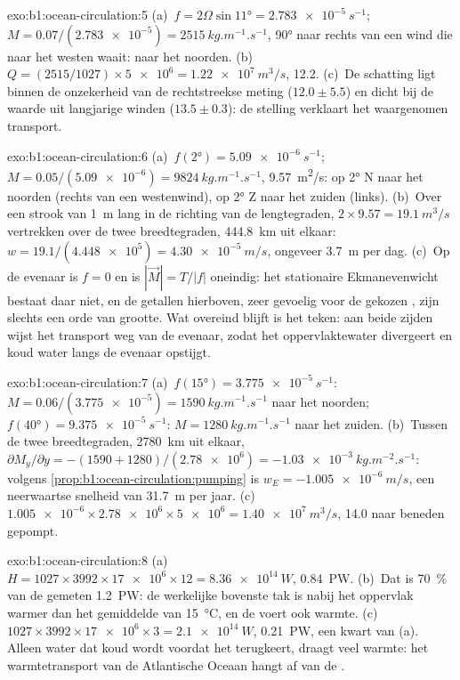 \begin{solution}{exo:b1:ocean-circulation:5}
(a)~$f = 2\Omega\sin\ang{11} = \qty{2.783e-5}{s^{-1}}$; $M = 0.07/(\num{2.783e-5}) =
\qty{2515}{kg.m^{-1}.s^{-1}}$, \ang{90} naar rechts van een wind die naar het westen waait:
naar het noorden. (b)~$Q = (2515/1027) \times \num{5e6} = \qty{1.22e7}{m^3/s}$,
\qty{12.2}{\sverdrup}. (c)~De schatting ligt binnen de onzekerheid van de rechtstreekse
meting ($12.0 \pm 5.5$) en dicht bij de waarde uit langjarige winden
($13.5 \pm 0.3$): de stelling verklaart het waargenomen transport.
\end{solution}

\begin{solution}{exo:b1:ocean-circulation:6}
(a)~$f(\ang{2}) = \qty{5.09e-6}{s^{-1}}$; $M = 0.05/(\num{5.09e-6}) =
\qty{9824}{kg.m^{-1}.s^{-1}}$, \qty{9.57}{m^2/s}: op \ang{2} N naar het noorden
(rechts van een westenwind), op \ang{2} Z naar het zuiden (links). (b)~Over een strook van
\qty{1}{m} lang in de richting van de lengtegraden, $2 \times 9.57 = \qty{19.1}{m^3/s}$ vertrekken over de twee
breedtegraden, \qty{444.8}{km} uit elkaar: $w = 19.1/(\num{4.448e5}) = \qty{4.30e-5}{m/s}$,
ongeveer \qty{3.7}{m} per dag. (c)~Op de evenaar is $f = 0$ en is $|\vec M| = T/|f|$
oneindig: het stationaire Ekmanevenwicht bestaat daar niet, en de getallen hierboven, zeer gevoelig voor de gekozen , zijn slechts een orde van grootte. Wat overeind blijft is het teken: aan beide zijden wijst het transport weg van de evenaar, zodat het oppervlaktewater divergeert en koud water langs de evenaar opstijgt.
\end{solution}

\begin{solution}{exo:b1:ocean-circulation:7}
(a)~$f(\ang{15}) = \qty{3.775e-5}{s^{-1}}$: $M = 0.06/(\num{3.775e-5}) =
\qty{1590}{kg.m^{-1}.s^{-1}}$ naar het noorden; $f(\ang{40}) =
\qty{9.375e-5}{s^{-1}}$: $M = \qty{1280}{kg.m^{-1}.s^{-1}}$ naar het zuiden.
(b)~Tussen de twee breedtegraden, \qty{2780}{km} uit elkaar, $\partial M_y/\partial y =
-(1590 + 1280)/(\num{2.78e6}) = \qty{-1.03e-3}{kg.m^{-2}.s^{-1}}$: volgens
\cref{prop:b1:ocean-circulation:pumping} is $w_E = \qty{-1.005e-6}{m/s}$, een neerwaartse
snelheid van \qty{31.7}{m} per jaar. (c)~$\num{1.005e-6} \times \num{2.78e6} \times
\num{5e6} = \qty{1.40e7}{m^3/s}$, \qty{14.0}{\sverdrup} naar beneden gepompt.
\end{solution}

\begin{solution}{exo:b1:ocean-circulation:8}
(a)~$H = 1027 \times 3992 \times \num{17e6} \times 12 = \qty{8.36e14}{W}$,
\qty{0.84}{PW}. (b)~Dat is \qty{70}{\percent} van de gemeten \qty{1.2}{PW}: de werkelijke bovenste tak is nabij het oppervlak warmer dan het gemiddelde van \qty{15}{\celsius}, en de  voert ook warmte. (c)~$1027 \times 3992 \times \num{17e6} \times 3 =
\qty{2.1e14}{W}$, \qty{0.21}{PW}, een kwart van (a). Alleen water dat koud wordt voordat het terugkeert, draagt veel warmte: het warmtetransport van de Atlantische Oceaan hangt af van de .
\end{solution}

